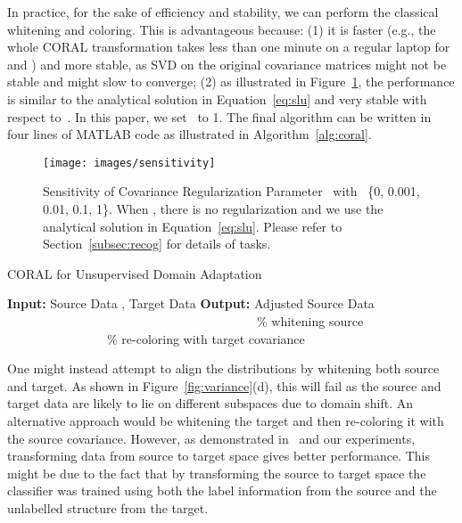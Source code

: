 \documentclass[letterpaper]{article}
\begin{document}
In practice, for the sake of efficiency and stability, we can perform the classical whitening and coloring. This is advantageous because: (1) 
it is faster (e.g., the whole CORAL transformation takes less than one minute on a regular laptop for  and ) and more stable, as SVD on the original covariance matrices might not be stable and might slow to converge; (2) as illustrated in Figure~\ref{fig:sens}, the performance is similar to the analytical solution in Equation~\eqref{eq:slu} and very stable with respect to~. In this paper, we set~ to 1. The final algorithm can be written in four lines of MATLAB code as illustrated in Algorithm~\ref{alg:coral}.
 
\begin{figure}
\centering
\texttt{[image: images/sensitivity]}
\vspace{-0.2in}
\caption{\small Sensitivity of Covariance Regularization Parameter~ with~ \{0, 0.001, 0.01, 0.1, 1\}. When , there is no regularization and we use the analytical solution in Equation~\eqref{eq:slu}. Please refer to Section~\ref{subsec:recog} for details of tasks.}
\label{fig:sens}
\end{figure}

\begin{algorithm}
\caption{CORAL for Unsupervised Domain Adaptation}
\begin{small}
\begin{algorithmic} 
\STATE \textbf{Input:} Source Data , Target Data 
\STATE \textbf{Output:} Adjusted Source Data 
\STATE 
\STATE 
\STATE   ~~~~~~~~~~~~~~~~~~~~~~~~~~~~~~~~~~~~~~~~\% whitening source
\STATE   ~~~~~~~~~~~~~~~~\% re-coloring with target covariance
\end{algorithmic} 
\end{small}
\label{alg:coral}
\end{algorithm}

One might instead attempt to align the distributions by whitening both source and target. As shown in Figure~\ref{fig:variance}(d), this will fail as the source and target data are likely to lie on different subspaces due to domain shift. An alternative approach would be whitening the target and then re-coloring it with the source covariance. However, as demonstrated in~\cite{outlooks,sasb} and our experiments, transforming data from source to target space gives better performance. 
This might be due to the fact that by transforming the source to target space the classifier was trained using both the label information from the source and the unlabelled structure from the target.
\end{document}

